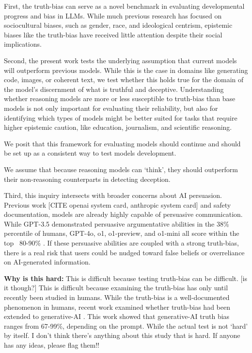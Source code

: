 \documentclass{article}
\begin{document}
First, the truth-bias can serve as a novel benchmark in evaluating developmental progress and bias in LLMs. While much previous research has focused on sociocultural biases, such as gender, race, and ideological centrism, epistemic biases like the truth-bias have received little attention despite their social implications.

Second, the present work tests the underlying assumption that current models will outperform previous models. While this is the case in domains like generating code, images, or coherent text, we test whether this holds true for the domain of the model's discernment of what is truthful and deceptive. Understanding whether reasoning models are more or less susceptible to truth-bias than base models is not only important for evaluating their reliability, but also for identifying which types of models might be better suited for tasks that require higher epistemic caution, like education, journalism, and scientific reasoning.

We posit that this framework for evaluating models should continue and should be set up as a consistent way to test models development.

We assume that because reasoning models can `think', they should outperform their non-reasoning counterparts in detecting deception.

Third, this inquiry intersects with broader concerns about AI persuasion. Previous work [CITE openai system card, anthropic system card] and safety documentation, models are already highly capable of persuasive communication. While GPT-3.5 demonstrated persuasive argumentative abilities in the 38\% percentile of humans, GPT-4o, o1, o1-preview, and o1-mini all score within the top ~80-90\% \citep{openai_openai_2024}. If these persuasive abilities are coupled with a strong truth-bias, there is a real risk that users could be nudged toward false beliefs or overreliance on AI-generated information.

\textbf{Why is this hard:} This is difficult because testing truth-bias can be difficult. [is it though?] This is difficult because examining the truth-bias has only until recently been studied in humans. While the truth-bias is a well-documented phenomenon in humans, recent work examined whether truth-bias had been extended to generative-AI \citep{markowitz_generative_2024}. This work showed that generative-AI truth bias ranges from 67-99\%, depending on the prompt. While the actual test is not `hard' by itself. I don't think there's anything about this study that is hard. If anyone has any ideas, please flag them!!
\end{document}
